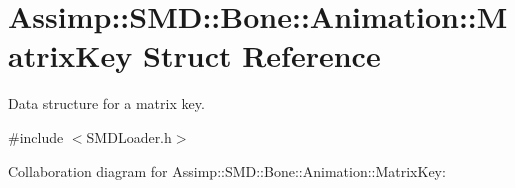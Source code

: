 \hypertarget{struct_assimp_1_1_s_m_d_1_1_bone_1_1_animation_1_1_matrix_key}{\section{Assimp\+:\+:S\+M\+D\+:\+:Bone\+:\+:Animation\+:\+:Matrix\+Key Struct Reference}
\label{struct_assimp_1_1_s_m_d_1_1_bone_1_1_animation_1_1_matrix_key}
}


Data structure for a matrix key.  




{\ttfamily \#include $<$S\+M\+D\+Loader.\+h$>$}



Collaboration diagram for Assimp\+:\+:S\+M\+D\+:\+:Bone\+:\+:Animation\+:\+:Matrix\+Key\+:
